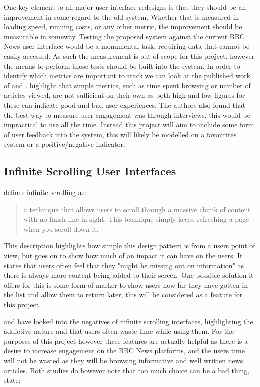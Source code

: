 \documentclass[12pt,titlepage]{article}
\begin{document}
  One key element to all major user interface redesigns is that they should be
  an improvement in some regard to the old system. Whether that is measured in
  loading speed, running costs, or any other metric, the improvement should be
  measurable in someway. Testing the proposed system against the current BBC
  News user interface would be a monumental task, requiring data that cannot be
  easily accessed. As such the measurement is out of scope for this project,
  however the means to perform those tests should be built into the system. In
  order to identify which metrics are important to track we can look at the
  published work of \cite{ux} and \cite{engagement}. \cite{ux} highlight that
  simple metrics, such as time spent browsing or number of articles viewed, are
  not sufficient on their own as both high and low figures for these can
  indicate good and bad user experiences. The authors also found that the best
  way to measure user engagement was through interviews, this would be
  impractical to use all the time. Instead this project will aim to include some
  form of user feedback into the system, this will likely be modelled on a
  favourites system or a positive/negative indicator.

  \subsection{Infinite Scrolling User Interfaces}

  \citep{newtarget} defines infinite scrolling as:

  \begin{quote}
    a technique that allows users to scroll through a massive chunk of content
    with no finish line in sight. This technique simply keeps refreshing a page
    when you scroll down it.
  \end{quote}

  This description highlights how simple this design pattern is from a users
  point of view, but goes on to show how much of an impact it can have on the
  users. It states that users often feel that they "might be missing out on
  information" \cite{newtarget} as there is always more content being added to
  their screen. One possible solution it offers for this is some form of marker
  to show users how far they have gotten in the list and allow them to return
  later, this will be considered as a feature for this project.

  \cite{neyman} and \cite{karlsson} have looked into the negatives of infinite
  scrolling interfaces, highlighting the addictive nature and that users often
  waste time while using them. For the purposes of this project however these
  features are actually helpful as there is a desire to increase engagement on
  the BBC News platforms, and the users time will not be wasted as they will be
  browsing informative and well written news articles. Both studies do however
  note that too much choice can be a bad thing, \cite{karlsson} state:
\end{document}

